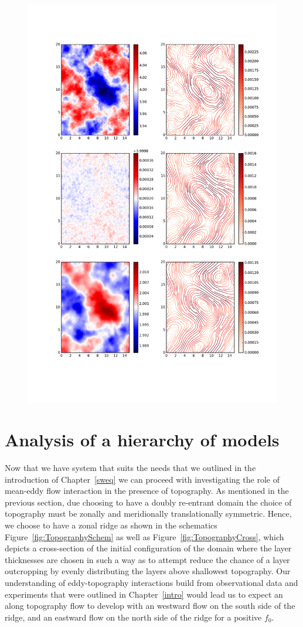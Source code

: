 \documentclass[12pt,a4paper]{report}
\newcommand*\figref[1]{Figure~\ref{#1}}
\begin{document}
  
  \begin{figure}
  	\centering
  	\includegraphics[width=0.8\linewidth]{notopmeanpv}
  	\caption{}
  	\label{fig:notopmeanpv}
  \end{figure}


\chapter{Analysis of a hierarchy of models}

Now that we have system that suits the needs that we outlined in the
introduction of Chapter~\ref{sweq} we can proceed with investigating the
role of mean-eddy flow interaction in the presence of topography.
As mentioned in the previous section, due choosing to have a doubly re-entrant
domain the choice of topography must be zonally and meridionally translationally symmetric.
Hence, we choose to have a zonal ridge as shown in the schematics
 \figref{fig:TopographySchem} as well as \figref{fig:TopographyCross}, which
 depicts a cross-section of the initial configuration of the domain where
 the layer thicknesses are chosen in such a way as to attempt reduce the chance of a
 layer outcropping by evenly distributing the layers above shallowest topography. Our
 understanding of eddy-topography interactions build from observational 
 data and experiments that were outlined in Chapter~\ref{intro} would lead us
 to expect an along topography flow to develop with an westward flow on the south side of
 the ridge, and an eastward flow on the north side of the ridge for a positive $f_{0}$.
\end{document}
